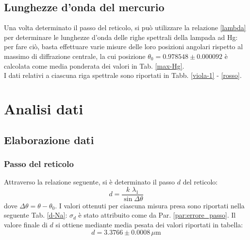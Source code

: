 \documentclass[]{article}
\let\oldsection\section%
\renewcommand{\section}{%
	\renewcommand{\theequation}{\thesection.\arabic{equation}}%
	\oldsection}%
\let\oldsubsection\subsection%
\renewcommand{\subsection}{%
	\renewcommand{\theequation}{\thesubsection.\arabic{equation}}%
	\oldsubsection}%
\begin{document}
    \subsection{Lunghezze d'onda del mercurio}
    Una volta determinato il passo del reticolo, si può utilizzare la relazione \ref{lambda} per determinare le lunghezze d'onda delle righe spettrali della lampada ad Hg: per fare ciò, basta effettuare varie misure delle loro posizioni angolari rispetto al massimo di diffrazione centrale, la cui posizione $\theta_0 = 0.978548 \pm 0.000092$ è calcolata come media ponderata dei valori in Tab. \ref{max-Hg}. \\
    I dati relativi a ciascuna riga spettrale sono riportati in Tabb. \ref{viola-1} - \ref{rosso}.

    \section{Analisi dati}
    \subsection{Elaborazione dati}
    \subsubsection{Passo del reticolo}
    Attraverso la relazione seguente, si è determinato il passo $d$ del reticolo: 
    \begin{equation}
        \label{passo}
        d = \frac{k \, \, \lambda_1}{\sin{\Delta\theta}}
    \end{equation}
    dove $\Delta\theta = \theta - \theta_0$.
    I valori ottenuti per ciascuna misura presa sono riportati nella seguente Tab. \ref{d-Na}: $\sigma_d$ è stato attribuito come da Par. \ref{par:errore_passo}.
    Il valore finale di $d$ si ottiene mediante media pesata dei valori riportati in tabella:
    \begin{equation}
        \label{d-value}
        d = 3.3766 \pm 0.0008 \,\mu\text{m}
    \end{equation}
\end{document}
